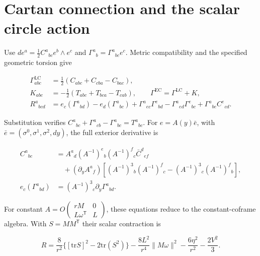 \section{Cartan connection and the scalar circle action}

\label{app:A}

Use $de^a=\tfrac12 C^a{}_{bc}e^b\wedge e^c$ and $\Gamma^a{}_b=\Gamma^a{}_{bc}e^c$. Metric compatibility and the specified geometric torsion give

\begin{equation}\tag{A1}\label{eq:A1}
\begin{aligned}
\Gamma^{\mathrm{LC}}_{abc}&=\tfrac12(C_{abc}+C_{cba}-C_{bac}),\\
K_{abc}&=-\tfrac12(T_{abc}+T_{bca}-T_{cab}),\qquad
\Gamma^{\mathrm{EC}}=\Gamma^{\mathrm{LC}}+K,\\
R^a{}_{bcd}&=e_c(\Gamma^a{}_{bd})-e_d(\Gamma^a{}_{bc})
+\Gamma^a{}_{ec}\Gamma^e{}_{bd}-\Gamma^a{}_{ed}\Gamma^e{}_{bc}
+\Gamma^a{}_{be}C^e{}_{cd}.
\end{aligned}
\end{equation}

Substitution verifies $C^a{}_{bc}+\Gamma^a{}_{cb}-\Gamma^a{}_{bc}=T^a{}_{bc}$. For $e=A(y)\bar e$, with $\bar e=(\sigma^0,\sigma^1,\sigma^2,dy)$, the full exterior derivative is

\begin{equation}\tag{A2}\label{eq:A2}
\begin{aligned}
C^a{}_{bc}
&=A^a{}_d(A^{-1})^e{}_b(A^{-1})^f{}_c\bar C^d{}_{ef}\\
&\quad +(\partial_y A^a{}_f)
\left[(A^{-1})^3{}_b(A^{-1})^f{}_c
-(A^{-1})^3{}_c(A^{-1})^f{}_b\right],\\
e_c(\Gamma^a{}_{bd})&=(A^{-1})^3{}_c\partial_y\Gamma^a{}_{bd}.
\end{aligned}
\end{equation}

For constant $A=O\left(\begin{smallmatrix}rM&0\\L\omega^{\mathsf T}&L\end{smallmatrix}\right)$, these equations reduce to the constant-coframe algebra. With $S=MM^{\mathsf T}$ their scalar contraction is

\begin{equation}\tag{A3}\label{eq:A3}
R=\frac{8}{r^2}\lbrace[\mathrm{tr}S]^2-2\mathrm{tr}(S^2)\rbrace
-\frac{8L^2}{r^4}\lVert M\omega\rVert^2-\frac{6\eta^2}{r^2}-\frac{2V^2}{3}.
\end{equation}

